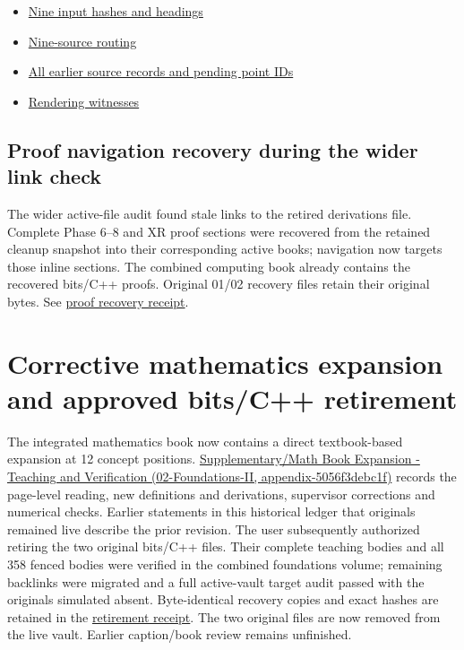 \begin{itemize}
\tightlist
\item
  \href{/Users/swayamsingal/.codex/source-cache/manual-integration-2026-11-10/rendering-sources.json}{Nine input hashes and headings}
\item
  \href{/Users/swayamsingal/.codex/source-cache/manual-integration-2026-11-10/rendering-route.json}{Nine-source routing}
\item
  \href{/Users/swayamsingal/.codex/source-cache/manual-integration-2026-11-10/ALL_SOURCES_BACKLOG.json}{All earlier source records and pending point IDs}
\item
  \href{/Users/swayamsingal/.codex/source-cache/manual-integration-2026-11-10/validation/rendering-witnesses.json}{Rendering witnesses}
\end{itemize}

\subsection{Proof navigation recovery during the wider link check}\label{appendix-3b67654799a2-proof-navigation-recovery-during-the-wider-link-check}

The wider active-file audit found stale links to the retired derivations file. Complete Phase 6--8 and XR proof sections were recovered from the retained cleanup snapshot into their corresponding active books; navigation now targets those inline sections. The combined computing book already contains the recovered bits/C++ proofs. Original 01/02 recovery files retain their original bytes. See \href{/Users/swayamsingal/.codex/source-cache/manual-integration-2026-11-10/proof-navigation-recovery.json}{proof recovery receipt}.

\section{Corrective mathematics expansion and approved bits/C++ retirement}\label{appendix-3b67654799a2-corrective-mathematics-expansion-and-approved-bitsc-retirement}

The integrated mathematics book now contains a direct textbook-based expansion at 12 concept positions. \href{../02-Foundations-II/main.pdf\#nameddest=appendix-5056f3debc1f}{Supplementary/Math Book Expansion - Teaching and Verification (02-Foundations-II, appendix-5056f3debc1f)} records the page-level reading, new definitions and derivations, supervisor corrections and numerical checks. Earlier statements in this historical ledger that originals remained live describe the prior revision. The user subsequently authorized retiring the two original bits/C++ files. Their complete teaching bodies and all 358 fenced bodies were verified in the combined foundations volume; remaining backlinks were migrated and a full active-vault target audit passed with the originals simulated absent. Byte-identical recovery copies and exact hashes are retained in the \href{/Users/swayamsingal/.codex/source-cache/manual-integration-2026-11-10/math-repair-2026-11-11/retirement-complete.json}{retirement receipt}. The two original files are now removed from the live vault. Earlier caption/book review remains unfinished.

